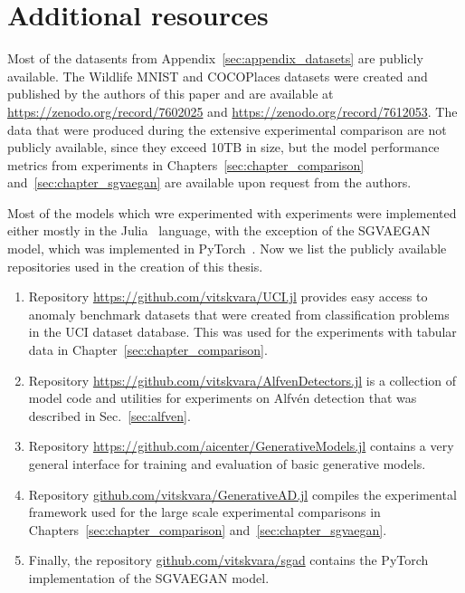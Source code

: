 \chapter{Additional resources} \label{sec:appendix_links}

Most of the datasents from Appendix~\ref{sec:appendix_datasets} are publicly available. The Wildlife MNIST and COCOPlaces datasets were created and published by the authors of this paper and are available at \url{https://zenodo.org/record/7602025} and \url{https://zenodo.org/record/7612053}. The data that were produced during the extensive experimental comparison are not publicly available, since they exceed 10TB in size, but the model performance metrics from experiments in Chapters~\ref{sec:chapter_comparison} and~\ref{sec:chapter_sgvaegan} are available upon request from the authors.

Most of the models which wre experimented with experiments were implemented either mostly in the Julia~\cite{Julia-2017} language, with the exception of the SGVAEGAN model, which was implemented in PyTorch~\cite{NEURIPS2019_9015}. Now we list the publicly available repositories used in the creation of this thesis.

\begin{enumerate}
    \item Repository \url{https://github.com/vitskvara/UCI.jl} provides easy access to anomaly benchmark datasets that were created from classification problems in the UCI dataset database. This was used for the experiments with tabular data in Chapter~\ref{sec:chapter_comparison}.
    \item Repository \url{https://github.com/vitskvara/AlfvenDetectors.jl} is a collection of model code and utilities for experiments on Alfvén detection that was described in Sec.~\ref{sec:alfven}.
    \item Repository \url{https://github.com/aicenter/GenerativeModels.jl} contains a very general interface for training and evaluation of basic generative models.
    \item Repository \url{github.com/vitskvara/GenerativeAD.jl} compiles the experimental framework used for the large scale experimental comparisons in Chapters~\ref{sec:chapter_comparison} and~\ref{sec:chapter_sgvaegan}.
    \item Finally, the repository \url{github.com/vitskvara/sgad} contains the PyTorch implementation of the SGVAEGAN model.
\end{enumerate}

